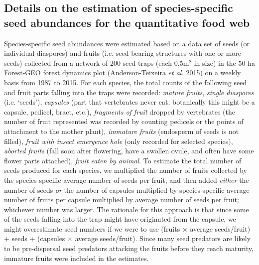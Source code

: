 \documentclass[11pt]{article}
\begin{document}
\subsection*{Details on the estimation of species-specific seed abundances for the quantitative food web}

Species-specific seed abundances were estimated based on a data set of seeds (or individual diaspores) and fruits (i.e. seed-bearing structures with one or more seeds) collected from a network of 200 seed traps (each 0.5m$^2$ in size) in the 50-ha Forest-GEO forest dynamics plot (Anderson-Teixeira \emph{et al. }2015) on a weekly basis from 1987 to 2015. For each species, the total counts of the following seed and fruit parts falling into the traps were recorded: \emph{mature fruits}, \emph{single diaspores} (i.e. `seeds’), \emph{capsules} (part that vertebrates never eat; botanically this might be a capsule, pedicel, bract, etc.), \emph{fragments of fruit} dropped by vertebrates (the number of fruit represented was recorded by counting pedicels or the points of attachment to the mother plant), \emph{immature fruits }(endosperm of seeds is not filled), \emph{fruit with insect emergence hole} (only recorded for selected species), \emph{aborted fruits} (fall soon after flowering, have a swollen ovule, and often have some flower parts attached), \emph{fruit eaten by animal}. To estimate the total number of seeds produced for each species, we multiplied the number of fruits collected by the species-specific average number of seeds per fruit, and then added \emph{either} the number of seeds \emph{or} the number of capsules multiplied by species-specific average number of fruits per capsule multiplied by average number of seeds per fruit; whichever number was larger. The rationale for this approach is that since some of the seeds falling into the trap might have originated from the capsule, we might overestimate seed numbers if we were to use (fruits $\times$ average seeds/fruit) + seeds + (capsules $\times$ average seeds/fruit). Since many seed predators are likely to be pre-dispersal seed predators attacking the fruits before they reach maturity, immature fruits were included in the estimates.
\end{document}
